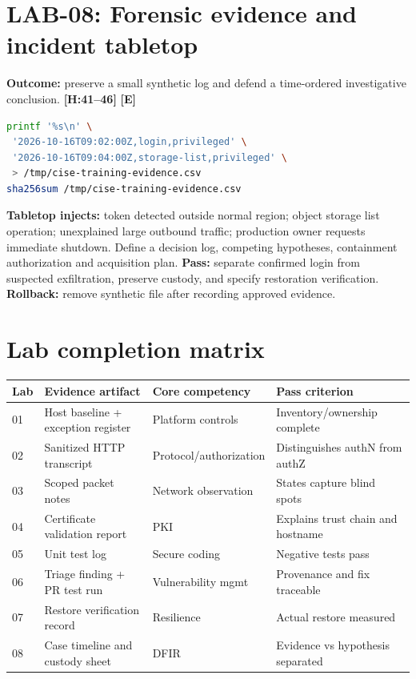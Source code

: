 \documentclass[10pt,letterpaper,oneside]{article}
\newcommand{\handbookref}[1]{\textsf{\color{accent}\textbf{[H:#1]}}}
\newcommand{\modernext}{\textsf{\color{muted}\textbf{[E]}}}
\begin{document}
\section{LAB-08: Forensic evidence and incident tabletop}
\textbf{Outcome:} preserve a small synthetic log and defend a time-ordered investigative conclusion. \handbookref{41--46} \modernext{}
\begin{lstlisting}[language=bash,caption={Hash a non-sensitive training evidence file}]
printf '%s\n' \
 '2026-10-16T09:02:00Z,login,privileged' \
 '2026-10-16T09:04:00Z,storage-list,privileged' \
 > /tmp/cise-training-evidence.csv
sha256sum /tmp/cise-training-evidence.csv
\end{lstlisting}
\textbf{Tabletop injects:} token detected outside normal region; object storage list operation; unexplained large outbound traffic; production owner requests immediate shutdown. Define a decision log, competing hypotheses, containment authorization and acquisition plan. \textbf{Pass:} separate confirmed login from suspected exfiltration, preserve custody, and specify restoration verification. \textbf{Rollback:} remove synthetic file after recording approved evidence.

\section{Lab completion matrix}
\par\medskip\noindent\begin{longtable}{@{}p{}p{}p{}p{}@{}}\toprule
Lab & Evidence artifact & Core competency & Pass criterion \\ \midrule\endhead
01 & Host baseline + exception register & Platform controls & Inventory/ownership complete\\
02 & Sanitized HTTP transcript & Protocol/authorization & Distinguishes authN from authZ\\
03 & Scoped packet notes & Network observation & States capture blind spots\\
04 & Certificate validation report & PKI & Explains trust chain and hostname\\
05 & Unit test log & Secure coding & Negative tests pass\\
06 & Triage finding + PR test run & Vulnerability mgmt & Provenance and fix traceable\\
07 & Restore verification record & Resilience & Actual restore measured\\
08 & Case timeline and custody sheet & DFIR & Evidence vs hypothesis separated\\
\bottomrule\end{longtable}\par\medskip
\end{document}
